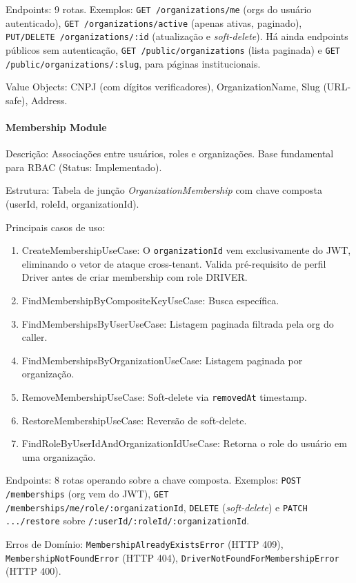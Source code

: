 Endpoints: 9 rotas. Exemplos: \texttt{GET /organizations/me} (orgs do usuário autenticado), \texttt{GET /organizations/active} (apenas ativas, paginado), \texttt{PUT/DELETE /organizations/:id} (atualização e \textit{soft-delete}). Há ainda endpoints públicos sem autenticação, \texttt{GET /public/organizations} (lista paginada) e \texttt{GET /public/organizations/:slug}, para páginas institucionais.

Value Objects: CNPJ (com dígitos verificadores), OrganizationName, Slug (URL-safe), Address.

\paragraph{Membership Module}

Descrição: Associações entre usuários, roles e organizações. Base fundamental para RBAC (Status: Implementado).

Estrutura: Tabela de junção \textit{OrganizationMembership} com chave composta (userId, roleId, organizationId).

Principais casos de uso:
\begin{enumerate}
\item CreateMembershipUseCase: O \texttt{organizationId} vem exclusivamente do JWT, eliminando o vetor de ataque cross-tenant. Valida pré-requisito de perfil Driver antes de criar membership com role DRIVER.
\item FindMembershipByCompositeKeyUseCase: Busca específica.
\item FindMembershipsByUserUseCase: Listagem paginada filtrada pela org do caller.
\item FindMembershipsByOrganizationUseCase: Listagem paginada por organização.
\item RemoveMembershipUseCase: Soft-delete via \texttt{removedAt} timestamp.
\item RestoreMembershipUseCase: Reversão de soft-delete.
\item FindRoleByUserIdAndOrganizationIdUseCase: Retorna o role do usuário em uma organização.
\end{enumerate}

Endpoints: 8 rotas operando sobre a chave composta. Exemplos: \texttt{POST /memberships} (org vem do JWT), \texttt{GET /memberships/me/role/:organizationId}, \texttt{DELETE} (\textit{soft-delete}) e \texttt{PATCH .../restore} sobre \texttt{/:userId/:roleId/:organizationId}.

Erros de Domínio: \texttt{MembershipAlreadyExistsError} (HTTP 409), \texttt{MembershipNotFoundError} (HTTP 404), \texttt{DriverNotFoundForMembershipError} (HTTP 400).

